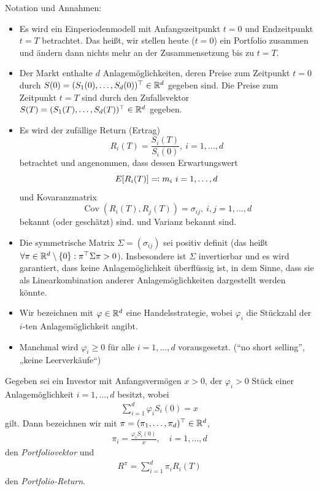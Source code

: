 \documentclass[a4paper,twoside,DIV15,BCOR12mm]{scrbook}
\DeclareMathOperator{\Cov}{Cov}
\begin{document}
Notation und Annahmen:
\begin{itemize}
\item Es wird ein Einperiodenmodell mit Anfangszeitpunkt $t=0$ und Endzeitpunkt $t=T$ betrachtet. Das heißt, wir stellen heute ($t=0$) ein Portfolio zusammen und ändern dann nichts mehr an der Zusammensetzung bis zu $t=T$.
\item Der Markt enthalte $d$ Anlagemöglichkeiten, deren Preise zum Zeitpunkt $t=0$ durch $S(0) = (S_1(0),\ldots,S_d(0))^\top \in \mathbb{R}^d$ gegeben sind. Die Preise zum Zeitpunkt $t=T$ sind durch den Zufallsvektor $S(T)=(S_1(T),\ldots,S_d(T))^\top\in\mathbb{R}^d$ gegeben.
\item Es wird der zufällige Return (Ertrag)
\[
R_i(T) = \frac{S_i(T)}{S_i(0)},\ i=1,\ldots,d
\]
betrachtet und angenommen, dass dessen Erwartungswert 
\[
E[R_i(T)]\ad m_i\ i=1,\ldots,d
\]
und Kovaranzmatrix 
\[
\Cov(R_i(T),R_j(T))=\sigma_{ij},\ i,j=1,\ldots,d
\]
bekannt (oder geschätzt) sind.
und Varianz bekannt sind.
\item Die symmetrische Matrix $\Sigma = (\sigma_{ij})$ sei positiv definit (das heißt $\forall \pi\in\mathbb{R}^d\setminus\{0\}: \pi^\top \Sigma \pi > 0$). Insbesondere ist $\Sigma$ invertierbar und es wird garantiert, dass keine Anlagemöglichkeit überflüssig ist, in dem Sinne, dass sie als Linearkombination anderer Anlagemöglichkeiten dargestellt werden könnte.
\item Wir bezeichnen mit $\varphi\in\mathbb{R}^d$ eine Handelsstrategie, wobei $\varphi_i$ die Stückzahl der $i$-ten Anlagemöglichkeit angibt.
\item Manchmal wird $\varphi_i \ge 0$ für alle $i=1,\ldots,d$ vorausgesetzt. (“no short selling”, „keine Leerverkäufe“)
\end{itemize}

\begin{definition}
Gegeben sei ein Investor mit Anfangsvermögen $x>0$, der $\varphi_i>0$ Stück einer Anlagemöglichkeit $i=1,\ldots,d$ besitzt, wobei 
\begin{align*}
\sum_{i=1}^d \varphi_i S_i(0)= x \tag{Budgetgleichung}
\end{align*}
gilt. Dann bezeichnen wir mit $\pi=(\pi_1,\ldots,\pi_d)^\top\in\mathbb{R}^d$,
\begin{align*}
\pi_i = \frac{\varphi_iS_i(0)}x,\quad i=1,\dots,d
\end{align*}
den \emph{Portfoliovektor} und
\begin{align*}
R^\pi = \sum_{i=1}^d \pi_iR_i(T)
\end{align*}
den \emph{Portfolio-Return}.
\end{definition}
\end{document}
